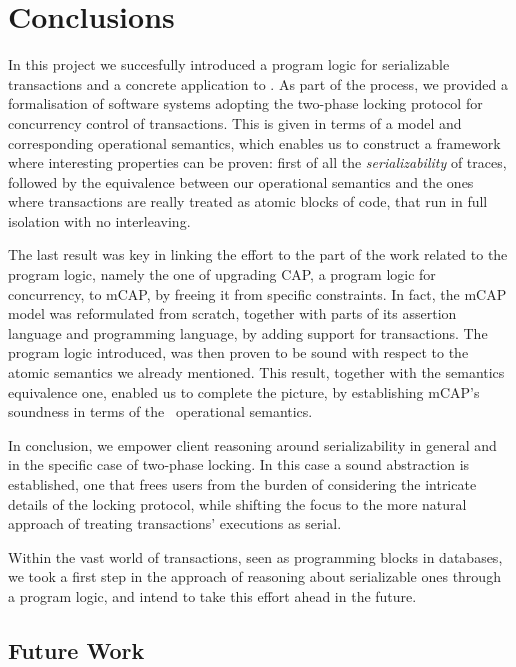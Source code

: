 \chapter{Conclusions}

In this project we succesfully introduced a program logic for serializable transactions and a concrete application to \tpl. As part of the process, we provided a formalisation of software systems adopting the two-phase locking protocol for concurrency control of transactions. This is given in terms of a model and corresponding operational semantics, which enables us to construct a framework where interesting properties can be proven: first of all the \textit{serializability} of traces, followed by the equivalence between our operational semantics and the ones where transactions are really treated as atomic blocks of code, that run in full isolation with no interleaving.

The last result was key in linking the effort to the part of the work related to the program logic, namely the one of upgrading CAP, a program logic for concurrency, to mCAP, by freeing it from specific constraints. In fact, the mCAP model was reformulated from scratch, together with parts of its assertion language and programming language, by adding support for transactions. The program logic introduced, was then proven to be sound with respect to the atomic semantics we already mentioned. This result, together with the semantics equivalence one, enabled us to complete the picture, by establishing mCAP's soundness in terms of the \tpl\ operational semantics.

In conclusion, we empower client reasoning around serializability in general and in the specific case of two-phase locking. In this case a sound abstraction is established, one that frees users from the burden of considering the intricate details of the locking protocol, while shifting the focus to the more natural approach of treating transactions' executions as serial.

Within the vast world of transactions, seen as programming blocks in databases, we took a first step in the approach of reasoning about serializable ones through a program logic, and intend to take this effort ahead in the future.

\section{Future Work}

